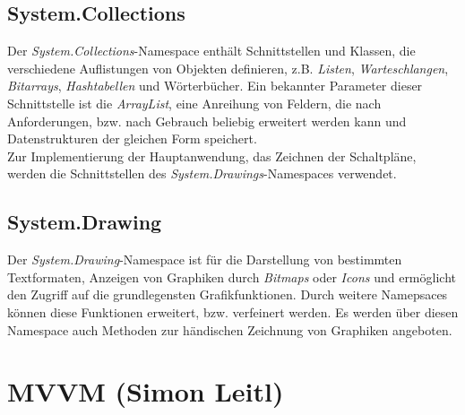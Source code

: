 \subsection{System.Collections}
Der \textit{System.Collections}-Namespace enthält Schnittstellen und Klassen, die verschiedene Auflistungen von Objekten definieren, 
z.B. \textit{Listen}, \textit{Warteschlangen}, \textit{Bitarrays}, \textit{Hashtabellen} und Wörterbücher. \cite{wpfmicrosoftcollection.2020a}
Ein bekannter Parameter dieser Schnittstelle ist die \textit{ArrayList}, eine Anreihung von Feldern, die nach Anforderungen, bzw. nach Gebrauch
beliebig erweitert werden kann und Datenstrukturen der gleichen Form speichert.
\\Zur Implementierung der Hauptanwendung, das Zeichnen der Schaltpläne, werden die Schnittstellen des 
\textit{System.Drawings}-Namespaces verwendet.  

\subsection{System.Drawing}
Der \textit{System.Drawing}-Namespace ist für die Darstellung von bestimmten Textformaten, Anzeigen von Graphiken 
durch \textit{Bitmaps} oder \textit{Icons} und ermöglicht den Zugriff auf die grundlegensten Grafikfunktionen. \cite{wpfmicrosoftdrawing.2020a} Durch weitere Namepsaces können diese 
Funktionen erweitert, bzw. verfeinert werden. Es werden über diesen Namespace auch Methoden zur händischen Zeichnung 
von Graphiken angeboten. 

\section{MVVM (Simon Leitl)}
\label{chap:MVVM}


